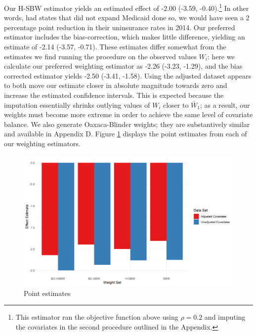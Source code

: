 \documentclass[12pt]{article}
\begin{document}
Our H-SBW estimator yields an estimated effect of -2.00 (-3.59, -0.40).\footnote{This estimator ran the objective function above using $\rho = 0.2$ and imputing the covariates in the second procedure outlined in the Appendix.} In other words, had states that did not expand Medicaid done so, we would have seen a 2 percentage point reduction in their uninsurance rates in 2014. Our preferred estimator includes the bias-correction, which makes little difference, yielding an estimate of -2.14 (-3.57, -0.71). These estimates differ somewhat from the estimates we find running the procedure on the observed values $W_i$: here we calculate our preferred weighting estimator as -2.26 (-3.23, -1.29), and the bias corrected estimator yields -2.50 (-3.41, -1.58). Using the adjusted dataset appears to both move our estimate closer in absolute magnitude towards zero and increase the estimated confidence intervals. This is expected because the imputation essentially shrinks outlying values of $W_i$ closer to $\bar{W}_1$; as a result, our weights must become more extreme in order to achieve the same level of covariate balance. We also generate Oaxaca-Blinder weights; they are substantively similar and available in Appendix D. Figure \ref{estimators} displays the point estimates from each of our weighting estimators. 

\begin{figure}[B]
\begin{center}
    \includegraphics[scale=0.6]{01_Plots/point-estimates-c1.png}
    \caption{Point estimates}
    \label{estimators}
\end{center}
\end{figure}
\end{document}
